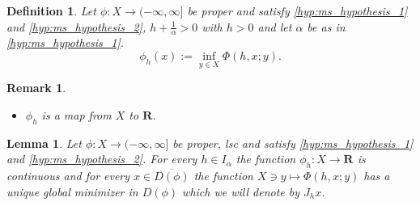 \documentclass[a4paper,11pt, leqno]{scrreprt} %
\newcommand{\R}{\mathbf R}
\theoremstyle{change}
\newcounter{acounter}[chapter]
\newtheorem{definition}[acounter]{Definition}
\newtheorem{lemma}[acounter]{Lemma}
\theoremstyle{nonumberplain}
\newtheorem{remark}{Remark}
\begin{document}
\begin{definition}
  Let $\phi: X \to (-\infty, \infty]$ be proper and satisfy
\ref{hyp:ms_hypothesis_1} and \ref{hyp:ms_hypothesis_2}, $h +
\frac1\alpha > 0$ with $h > 0$ and let $\alpha$ be as in
\ref{hyp:ms_hypothesis_1}.
\begin{equation}
  \label{eq:ms_phi_h_def}
  \phi_h(x) := \inf_{y \in X} \Phi(h, x; y).
\end{equation}
\end{definition}

\begin{remark}
  \mbox{}
  \begin{itemize}
  \item $\phi_h$ is a map from $X$ to $\R$.
  \end{itemize}
\end{remark}

\begin{lemma}\label{lem:ms_lem_2}
  Let $\phi:X \to (-\infty, \infty]$ be proper, lsc and satisfy
  \ref{hyp:ms_hypothesis_1} and \ref{hyp:ms_hypothesis_2}. For every
  $h \in I_\alpha$ the function $\phi_h: X \to \R$ is continuous and
  for every $x \in \overline{D(\phi)}$ the function $X \ni y \mapsto
  \Phi(h, x; y)$ has a unique global minimizer in $D(\phi)$ which we
  will denote by $J_h x$.
\end{lemma}
\end{document}
